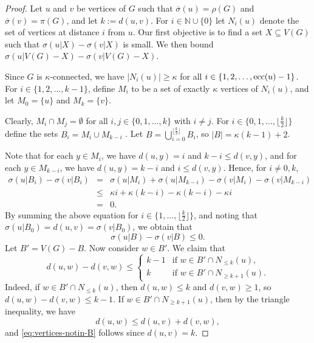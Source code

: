 \documentclass[a4paper,11pt]{article}
\begin{document}
\begin{proof}  
Let \( u \) and \( v \) be vertices of \( G \) such that \( \overline{\sigma}(u) = \rho(G) \) 
and \( \overline{\sigma}(v) = \pi(G) \), and let $k:= d(u,v)$. For $i \in \mathbb{N} \cup \{0\}$ let 
\( N_i(u) \) denote the set of vertices at distance \( i \) from \( u \). 
Our first objective is to find a set \( X \subseteq V(G) \) such that \( \sigma(u|X) - \sigma(v|X) \) 
is small. We then bound \( \sigma(u|V(G) - X) - \sigma(v|V(G) - X) \).

Since $G$ is $\kappa$-connected, we have $|N_i(u)| \geq \kappa$ for all 
$i\in \{1,2,\ldots,{\rm ecc}(u)-1\}$. For \( i \in \{1, 2, \ldots, k-1\} \), define $M_i$ 
to be a set of exactly $\kappa$ vertices of $N_i(u)$, and let \( M_0 =\{u\} \) and \(M_k = \{ v\} \).

Clearly, $M_i \cap M_j = \emptyset$ for all $i, j \in \{0, 1,\ldots,k\}$ with $i\neq j$. 
For \( i \in \{0, 1, \ldots, \lfloor\frac{k}{2}\rfloor\} \) define the sets 
\( B_i = M_i \cup M_{k-i} \) . Let 
\( B = \bigcup_{i=0}^{\lfloor\frac{k}{2}\rfloor} B_i \), so \( |B| = \kappa(k - 1)+2 \).

Note that for each \( y \in M_i \), we have \( d(u, y) = i \) and \( k-i \leq d(v, y) \), and for each \( y \in M_{k-i} \), we have \( d(u, y) = k - i \) and \( i \leq d(v, y)  \). Hence, for $i \neq 0,k$, 
\begin{eqnarray*}
\sigma(u|B_i) - \sigma(v|B_i) 
  &=&  \sigma(u|M_i) + \sigma(u|M_{k-i}) - \sigma(v|M_i) - \sigma(v|M_{k-i}) \\
& \leq&  \kappa i + \kappa(k-i) - \kappa(k-i) - \kappa i \\
& =&  0.
\end{eqnarray*}
By summing the above equation for \( i \in \{1, \ldots, \lfloor\frac{k}{2}\rfloor\} \), and noting 
that \(\sigma(u|B_0) = d(u,v) = \sigma(v|B_0) \), we obtain that 
\begin{equation}\label{eq:total-distance-of-B}
\sigma(u|B) - \sigma(v|B) \leq 0.
\end{equation}
Let $B'=V(G)-B$. Now consider \( w \in B' \). We claim that
\begin{equation} \label{eq:vertices-notin-B} 
d(u,w) - d(v,w) \leq \left\{ \begin{array}{cl}
k-1 & \textrm{if $w \in B' \cap N_{\leq k}(u)$,} \\
k & \textrm{if $w \in B' \cap N_{\geq k+1}(u)$.}
\end{array} \right. 
\end{equation}
Indeed, if $w \in B' \cap N_{\leq k}(u)$, then $d(u,w) \leq k$ and $d(v,w) \geq 1$, so 
$d(u,w) - d(v,w) \leq k-1$. If $w \in B' \cap N_{\geq k+1}(u)$, then 
by the triangle inequality, we have
\[
d(u, w) \leq d(u, v) + d(v, w),
\]
and \eqref{eq:vertices-notin-B} follows since $d(u,v)=k$. 



\end{proof}
\end{document}
